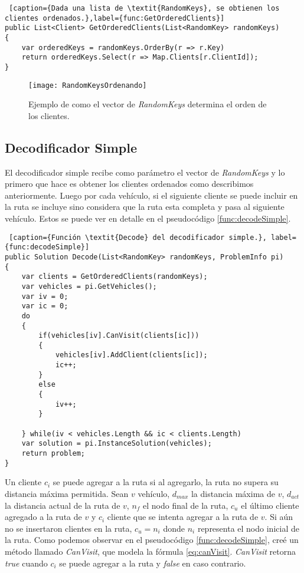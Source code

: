 \bigskip

\begin{minipage}{\linewidth}
\begin{lstlisting} [caption={Dada una lista de \textit{RandomKeys}, se obtienen los clientes ordenados.},label={func:GetOrderedClients}]
public List<Client> GetOrderedClients(List<RandomKey> randomKeys)
{        
	var orderedKeys = randomKeys.OrderBy(r => r.Key)
	return orderedKeys.Select(r => Map.Clients[r.ClientId]);
}
\end{lstlisting}
\end{minipage}

\begin{figure}[h]
	\caption{Ejemplo de como el vector de \textit{RandomKeys} determina el orden de los clientes.}
	\centering
	\texttt{[image: RandomKeysOrdenando]}
	\label{fig:RandomKeysOrdenando}
\end{figure}

\subsection{Decodificador Simple}

El decodificador simple recibe como parámetro el vector de \textit{RandomKeys} y lo primero que hace es obtener los clientes ordenados como describimos anteriormente. Luego por cada vehículo, si el siguiente cliente se puede incluir en la ruta se incluye sino considera que la ruta esta completa y pasa al siguiente vehículo. Estos se puede ver en detalle en el pseudocódigo \ref{func:decodeSimple}. 

\bigskip

\begin{minipage}{\linewidth}
\begin{lstlisting} [caption={Función \textit{Decode} del decodificador simple.}, label={func:decodeSimple}]
public Solution Decode(List<RandomKey> randomKeys, ProblemInfo pi)
{
	var clients = GetOrderedClients(randomKeys);
	var vehicles = pi.GetVehicles();	
	var iv = 0;
	var ic = 0;	
	do
	{
		if(vehicles[iv].CanVisit(clients[ic]))
		{
			vehicles[iv].AddClient(clients[ic]);
			ic++;
		}
		else
		{
			iv++;			
		}
		
	} while(iv < vehicles.Length && ic < clients.Length)	
	var solution = pi.InstanceSolution(vehicles);
	return problem;
}
\end{lstlisting}
\end{minipage}

Un cliente $c_i$ se puede agregar a la ruta si al agregarlo, la ruta no supera su distancia máxima permitida. Sean $v$ vehículo, $d_{max}$ la distancia máxima de $v$, $d_{act}$ la distancia actual de la ruta de $v$, $n_f$ el nodo final de la ruta, $c_u$ el último cliente agregado a la ruta de $v$ y $c_i$ cliente que se intenta agregar a la ruta de $v$. Si aún no se insertaron clientes en la ruta, $c_u = n_i$ donde $n_i$ representa el nodo inicial de la ruta. Como podemos observar en el pseudocódigo \ref{func:decodeSimple}, creé un método llamado \textit{CanVisit}, que modela la fórmula \ref{eq:canVisit}. \textit{CanVisit} retorna \textit{true} cuando $c_i$ se puede agregar a la ruta y \textit{false} en caso contrario.

